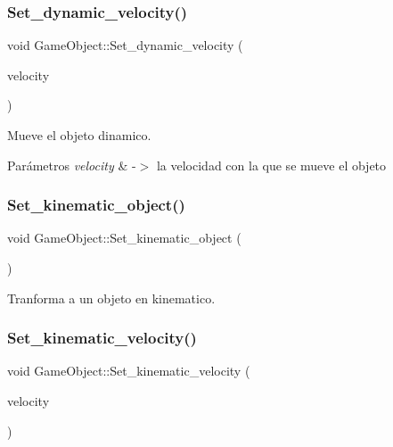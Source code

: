 \subsubsection{\texorpdfstring{Set\_dynamic\_velocity()}{Set\_dynamic\_velocity()}}
{\footnotesize\ttfamily void Game\+Object\+::\+Set\+\_\+dynamic\+\_\+velocity (\begin{DoxyParamCaption}\item[{bt\+Vector3 \&}]{velocity }\end{DoxyParamCaption})}



Mueve el objeto dinamico. 


\begin{DoxyParams}{Parámetros}
{\em velocity} & -\/$>$ la velocidad con la que se mueve el objeto \\
\hline
\end{DoxyParams}
\mbox{\label{classbullet_1_1_game_object_a68d55afbaae12acbedc24ca8c7b373ef}} 
\subsubsection{\texorpdfstring{Set\_kinematic\_object()}{Set\_kinematic\_object()}}
{\footnotesize\ttfamily void Game\+Object\+::\+Set\+\_\+kinematic\+\_\+object (\begin{DoxyParamCaption}{ }\end{DoxyParamCaption})}



Tranforma a un objeto en kinematico. 

\mbox{\label{classbullet_1_1_game_object_ad8a2ae02e95c6ba340be8881417cb9a2}} 
\subsubsection{\texorpdfstring{Set\_kinematic\_velocity()}{Set\_kinematic\_velocity()}}
{\footnotesize\ttfamily void Game\+Object\+::\+Set\+\_\+kinematic\+\_\+velocity (\begin{DoxyParamCaption}\item[{bt\+Vector3 \&}]{velocity }\end{DoxyParamCaption})}



